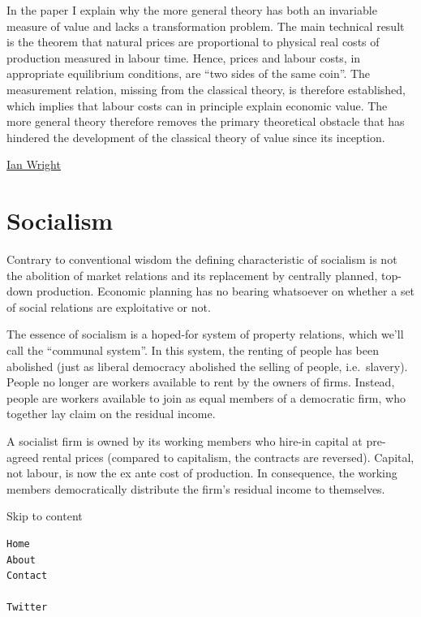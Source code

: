 \documentclass[
]{book}
\begin{document}
In the paper I explain why the more general theory has both an invariable measure of value and lacks a transformation problem. The main technical result is the theorem that natural prices are proportional to physical real costs of production measured in labour time. Hence, prices and labour costs, in appropriate equilibrium conditions, are ``two sides of the same coin''. The measurement relation, missing from the classical theory, is therefore established, which implies that labour costs can in principle explain economic value. The more general theory therefore removes the primary theoretical obstacle that has hindered the development of the classical theory of value since its inception.

\href{https://ianwrightsite.wordpress.com/2017/06/30/a-category-mistake-in-the-classical-labour-theory-of-value/}{Ian Wright}

\hypertarget{socialism}{%
\chapter{Socialism}\label{socialism}}

Contrary to conventional wisdom the defining characteristic of socialism is not the abolition of market relations and its replacement by centrally planned, top-down production. Economic planning has no bearing whatsoever on whether a set of social relations are exploitative or not.

The essence of socialism is a hoped-for system of property relations, which we'll call the ``communal system''. In this system, the renting of people has been abolished (just as liberal democracy abolished the selling of people, i.e.~slavery). People no longer are workers available to rent by the owners of firms. Instead, people are workers available to join as equal members of a democratic firm, who together lay claim on the residual income.

A socialist firm is owned by its working members who hire-in capital at pre-agreed rental prices (compared to capitalism, the contracts are reversed). Capital, not labour, is now the ex ante cost of production. In consequence, the working members democratically distribute the firm's residual income to themselves.

Skip to content

\begin{verbatim}
Home
About
Contact

Twitter
\end{verbatim}
\end{document}
